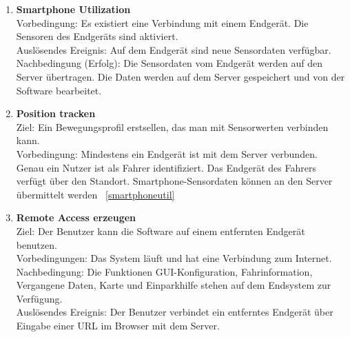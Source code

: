 \documentclass[pflichtenheft.tex]{subfiles}
\begin{document}
\begin{enumerate}
		\renewcommand{\theenumi}{/FA\ifnum \value{enumi}<10 0\fi\arabic{enumi}0W/}
		\renewcommand{\labelenumi}{\theenumi}
		\renewcommand{\theenumii}{\arabic{enumii}}
		\renewcommand{\labelenumii}{/FA\ifnum \value{enumi}<10 0\fi\arabic{enumi}\arabic{enumii}W/}

		\item{\textbf{Smartphone Utilization}} \label{smartphoneutil} \\
		Vorbedingung: Es existiert eine Verbindung mit einem Endgerät. Die Sensoren des Endgeräts sind aktiviert.\\Auslösendes Ereignis: Auf dem Endgerät sind neue Sensordaten verfügbar. \\ Nachbedingung (Erfolg): Die Sensordaten vom Endgerät werden auf den Server übertragen. Die Daten werden auf dem Server gespeichert und von der Software bearbeitet.

		\item{\textbf{Position tracken}}\\
		Ziel: Ein Bewegungsprofil erstsellen, das man mit Sensorwerten verbinden kann.\\
		Vorbedingung: Mindestens ein Endgerät ist mit dem Server verbunden. Genau ein Nutzer ist als Fahrer identifiziert. Das Endgerät des Fahrers verfügt über den Standort. Smartphone-Sensordaten können an den Server übermittelt werden ~\ref{smartphoneutil}

		\renewcommand{\theenumi}{/FA\ifnum \value{enumi}<10 0\fi\arabic{enumi}0/}
		\renewcommand{\labelenumi}{\theenumi}
		\renewcommand{\theenumii}{\arabic{enumii}}
		\renewcommand{\labelenumii}{/FA\ifnum \value{enumi}<10 0\fi\arabic{enumi}\arabic{enumii}/}
		
		\item{\textbf{Remote Access erzeugen}} \label{remote} \\ Ziel: Der Benutzer kann die Software auf einem entfernten Endgerät benutzen.\\ Vorbedingungen: Das System läuft und hat eine Verbindung zum Internet.\\ Nachbedingung: Die Funktionen GUI-Konfiguration, Fahrinformation, Vergangene Daten, Karte und Einparkhilfe stehen auf dem Endsystem zur Verfügung.\\ Auslösendes Ereignis: Der Benutzer verbindet ein entferntes Endgerät über Eingabe einer URL im Browser mit dem Server.
		\setcounter{enumTemp}{\value{enumi}}
	\end{enumerate} 
\end{document}
